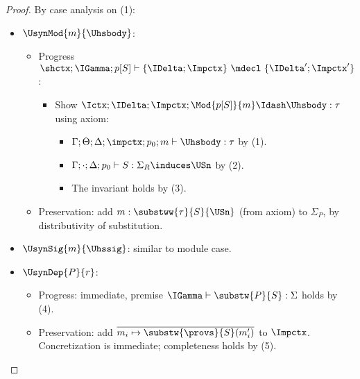 \begin{proof}
By case analysis on (1):
\begin{itemize}
\item $\UsynMod{m}{\Uhsbody}$:
    \begin{itemize}
        \item Progress $\shctx; \IGamma; p[S] \vdash \{ \IDelta; \Impctx \} ~ \mdecl ~ \{ \IDelta'; \Impctx' \}$:
        \begin{itemize}
          \item Show $\Ictx; \IDelta; \Impctx; \Mod{p[S]}{m} \Idash \Uhsbody : \tau$ using axiom:
          \begin{itemize}
            \item $\Gamma; \Theta; \Delta; \impctx; p_0; m \vdash \Uhsbody : \tau$ by (1).
            \item $\Gamma; \cdot; \Delta; p_0 \vdash S : \Sigma_R \induces \USn$ by (2).
            \item The invariant holds by (3).
          \end{itemize}

        \end{itemize}
        \item Preservation: add $m : \substww{\tau}{S}{\USn}$ (from axiom) to $\Sigma_P$, by distributivity of substitution.
    \end{itemize}
    \item $\UsynSig{m}{\Uhssig}$: similar to module case.
    \item $\UsynDep{P}{r}$:
    \begin{itemize}
        \item Progress: immediate, premise $\IGamma \vdash \substw{P}{S} : \Sigma$
            holds by (4).
        \item Preservation: add $\overline{m_i \mapsto \substw{\provs}{S}(m'_i)}$ to $\Impctx$.  Concretization is immediate; completeness holds by (5).
    \end{itemize}
\end{itemize}
\end{proof}

